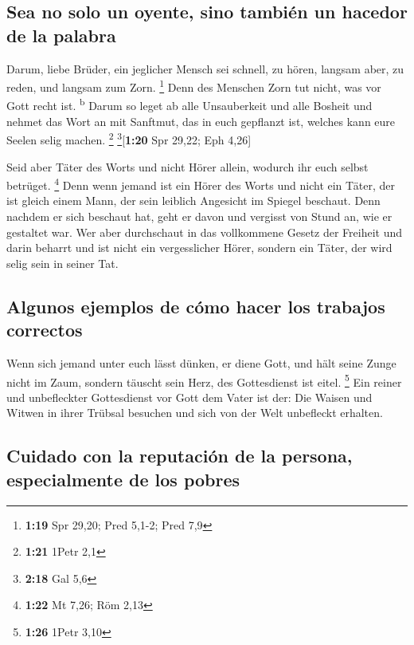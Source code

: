 \hypertarget{sea-no-solo-un-oyente-sino-tambiuxe9n-un-hacedor-de-la-palabra}{%
\subsection{Sea no solo un oyente, sino también un hacedor de la
palabra}\label{sea-no-solo-un-oyente-sino-tambiuxe9n-un-hacedor-de-la-palabra}}

 Darum, liebe Brüder, ein jeglicher Mensch sei schnell,
zu hören, langsam aber, zu reden, und langsam zum Zorn. \footnote{\textbf{1:19}
  Spr 29,20; Pred 5,1-2; Pred 7,9}  Denn des Menschen
Zorn tut nicht, was vor Gott recht ist. \textsuperscript{b}
 Darum so leget ab alle Unsauberkeit und alle Bosheit und
nehmet das Wort an mit Sanftmut, das in euch gepflanzt ist, welches kann
eure Seelen selig machen. \footnote{\textbf{1:21} 1Petr 2,1}
\footnote{\textbf{2:18} Gal 5,6}{[}\textbf{1:20} Spr 29,22; Eph 4,26{]}

 Seid aber Täter des Worts und nicht Hörer allein,
wodurch ihr euch selbst betrüget. \footnote{\textbf{1:22} Mt 7,26; Röm
  2,13}  Denn wenn jemand ist ein Hörer des Worts und
nicht ein Täter, der ist gleich einem Mann, der sein leiblich Angesicht
im Spiegel beschaut.  Denn nachdem er sich beschaut hat,
geht er davon und vergisst von Stund an, wie er gestaltet war.
 Wer aber durchschaut in das vollkommene Gesetz der
Freiheit und darin beharrt und ist nicht ein vergesslicher Hörer,
sondern ein Täter, der wird selig sein in seiner Tat.

\hypertarget{algunos-ejemplos-de-cuxf3mo-hacer-los-trabajos-correctos}{%
\subsection{Algunos ejemplos de cómo hacer los trabajos
correctos}\label{algunos-ejemplos-de-cuxf3mo-hacer-los-trabajos-correctos}}

 Wenn sich jemand unter euch lässt dünken, er diene Gott,
und hält seine Zunge nicht im Zaum, sondern täuscht sein Herz, des
Gottesdienst ist eitel. \footnote{\textbf{1:26} 1Petr 3,10}
 Ein reiner und unbefleckter Gottesdienst vor Gott dem
Vater ist der: Die Waisen und Witwen in ihrer Trübsal besuchen und sich
von der Welt unbefleckt erhalten.

\hypertarget{cuidado-con-la-reputaciuxf3n-de-la-persona-especialmente-de-los-pobres}{%
\subsection{Cuidado con la reputación de la persona, especialmente de
los
pobres}\label{cuidado-con-la-reputaciuxf3n-de-la-persona-especialmente-de-los-pobres}}

